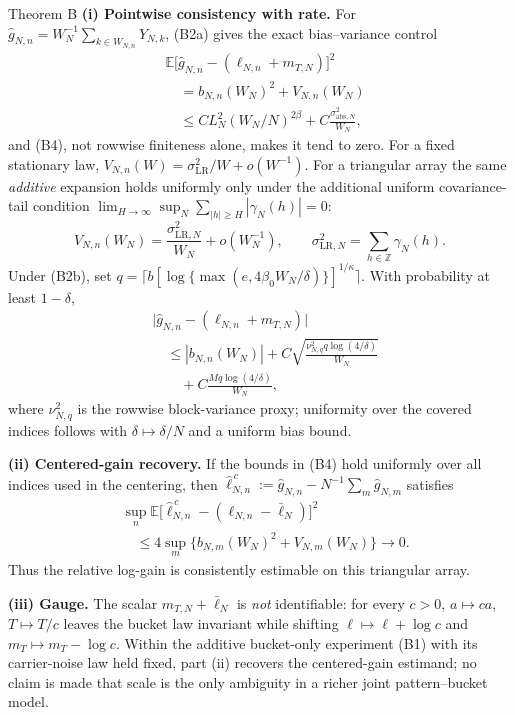 \begin{namedthm}{Theorem B}
\textbf{(i) Pointwise consistency with rate.} For $\hat g_{N,n}=W_N^{-1}\sum_{k\in W_{N,n}}Y_{N,k}$, (B2a) gives the exact bias--variance control
\[
\begin{aligned}
&\mathbb E\big[\hat g_{N,n}-(\ell_{N,n}+m_{T,N})\big]^2\\
&\quad=b_{N,n}(W_N)^2+V_{N,n}(W_N)\\
&\quad\le C L_N^2(W_N/N)^{2\beta}
 +C\frac{\sigma_{\mathrm{abs},N}^2}{W_N},
\end{aligned}
\]
and (B4), not rowwise finiteness alone, makes it tend to zero. For a fixed stationary law, $V_{N,n}(W)=\sigma_{\mathrm{LR}}^2/W+o(W^{-1})$. For a triangular array the same \emph{additive} expansion holds uniformly only under the additional uniform covariance-tail condition $\lim_{H\to\infty}\sup_N\sum_{|h|\ge H}|\gamma_N(h)|=0$:
\[
V_{N,n}(W_N)=\frac{\sigma_{\mathrm{LR},N}^2}{W_N}+o(W_N^{-1}),
\qquad \sigma_{\mathrm{LR},N}^2=\sum_{h\in\mathbb Z}\gamma_N(h).
\]
Under (B2b), set $q=\lceil b[\log\{\max(e,4\beta_0W_N/\delta)\}]^{1/\kappa}\rceil$. With probability at least $1-\delta$,
\[
\begin{aligned}
&\big|\hat g_{N,n}-(\ell_{N,n}+m_{T,N})\big|\\
&\quad\le |b_{N,n}(W_N)|
 +C\sqrt{\frac{\nu_{N,q}^2q\log(4/\delta)}{W_N}}\\
&\qquad+C\frac{Mq\log(4/\delta)}{W_N},
\end{aligned}
\]
where $\nu_{N,q}^2$ is the rowwise block-variance proxy; uniformity over the covered indices follows with $\delta\mapsto\delta/N$ and a uniform bias bound.

\textbf{(ii) Centered-gain recovery.} If the bounds in (B4) hold uniformly over all indices used in the centering, then $\hat\ell_{N,n}^{\,c}:=\hat g_{N,n}-N^{-1}\sum_m\hat g_{N,m}$ satisfies
\[
\begin{aligned}
&\sup_n\mathbb E\big[
 \hat\ell_{N,n}^{\,c}-(\ell_{N,n}-\bar\ell_N)
 \big]^2\\
&\quad\le4\sup_m\{
 b_{N,m}(W_N)^2+V_{N,m}(W_N)
 \}\longrightarrow0.
\end{aligned}
\]
Thus the relative log-gain is consistently estimable on this triangular array.

\textbf{(iii) Gauge.} The scalar $m_{T,N}+\bar\ell_N$ is \emph{not} identifiable: for every $c>0$, $a\mapsto ca$, $T\mapsto T/c$ leaves the bucket law invariant while shifting $\ell\mapsto\ell+\log c$ and $m_T\mapsto m_T-\log c$. Within the additive bucket-only experiment (B1) with its carrier-noise law held fixed, part (ii) recovers the centered-gain estimand; no claim is made that scale is the only ambiguity in a richer joint pattern--bucket model.
\end{namedthm}

